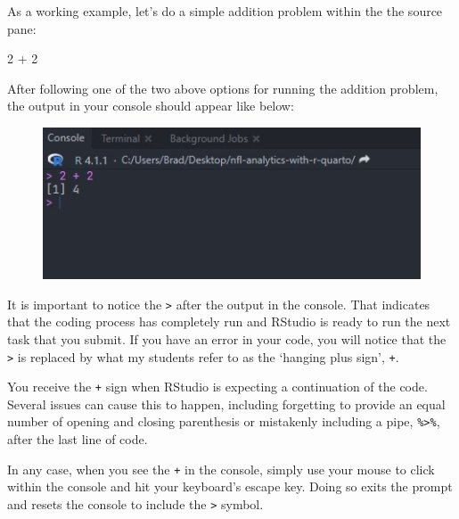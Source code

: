 \documentclass[
  letterpaper,
]{krantz}
\newenvironment{Shaded}{\begin{snugshade}}{\end{snugshade}}
\newcommand{\DecValTok}[1]{\textcolor[rgb]{0.68,0.00,0.00}{#1}}
\newcommand{\SpecialCharTok}[1]{\textcolor[rgb]{0.37,0.37,0.37}{#1}}
\begin{document}
As a working example, let's do a simple addition problem within the the
source pane:

\begin{Shaded}
\begin{Highlighting}[]
\DecValTok{2} \SpecialCharTok{+} \DecValTok{2}
\end{Highlighting}
\end{Shaded}

After following one of the two above options for running the addition
problem, the output in your console should appear like below:

\begin{figure}

{\centering \includegraphics{images/example_console_output.jpg}

}

\end{figure}

\begin{tcolorbox}[enhanced jigsaw, colback=white, leftrule=.75mm, breakable, colframe=quarto-callout-tip-color-frame, bottomtitle=1mm, rightrule=.15mm, left=2mm, opacityback=0, bottomrule=.15mm, arc=.35mm, coltitle=black, colbacktitle=quarto-callout-tip-color!10!white, toptitle=1mm, titlerule=0mm, title=\textcolor{quarto-callout-tip-color}{\faLightbulb}\hspace{0.5em}{Tip}, toprule=.15mm, opacitybacktitle=0.6]

It is important to notice the \texttt{\textgreater{}} after the output
in the console. That indicates that the coding process has completely
run and RStudio is ready to run the next task that you submit. If you
have an error in your code, you will notice that the
\texttt{\textgreater{}} is replaced by what my students refer to as the
`hanging plus sign', \texttt{+}.

You receive the \texttt{+} sign when RStudio is expecting a continuation
of the code. Several issues can cause this to happen, including
forgetting to provide an equal number of opening and closing parenthesis
or mistakenly including a pipe, \texttt{\%\textgreater{}\%}, after the
last line of code.

In any case, when you see the \texttt{+} in the console, simply use your
mouse to click within the console and hit your keyboard's escape key.
Doing so exits the prompt and resets the console to include the
\texttt{\textgreater{}} symbol.

\end{tcolorbox}
\end{document}
